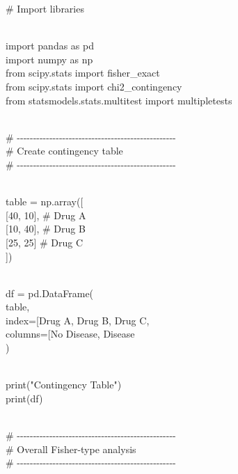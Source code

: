 \documentclass[
]{article}
\begin{document}
\# Import libraries\\
\strut \\
import pandas as pd\\
import numpy as np\\
from scipy.stats import fisher\_exact\\
from scipy.stats import chi2\_contingency\\
from statsmodels.stats.multitest import multipletests\\
\strut \\
\#
-\/-\/-\/-\/-\/-\/-\/-\/-\/-\/-\/-\/-\/-\/-\/-\/-\/-\/-\/-\/-\/-\/-\/-\/-\/-\/-\/-\/-\/-\/-\/-\/-\/-\/-\/-\/-\/-\/-\/-\/-\/-\/-\/-\/-\/-\/-\/-\/-\\
\# Create contingency table\\
\#
-\/-\/-\/-\/-\/-\/-\/-\/-\/-\/-\/-\/-\/-\/-\/-\/-\/-\/-\/-\/-\/-\/-\/-\/-\/-\/-\/-\/-\/-\/-\/-\/-\/-\/-\/-\/-\/-\/-\/-\/-\/-\/-\/-\/-\/-\/-\/-\/-\\
\strut \\
table = np.array({[}\\
{[}40, 10{]}, \# Drug A\\
{[}10, 40{]}, \# Drug B\\
{[}25, 25{]} \# Drug C\\
{]})\\
\strut \\
df = pd.DataFrame(\\
table,\\
index={[}\textquotesingle Drug A\textquotesingle, \textquotesingle Drug
B\textquotesingle, \textquotesingle Drug C\textquotesingle{]},\\
columns={[}\textquotesingle No Disease\textquotesingle,
\textquotesingle Disease\textquotesingle{]}\\
)\\
\strut \\
print("Contingency Table")\\
print(df)\\
\strut \\
\#
-\/-\/-\/-\/-\/-\/-\/-\/-\/-\/-\/-\/-\/-\/-\/-\/-\/-\/-\/-\/-\/-\/-\/-\/-\/-\/-\/-\/-\/-\/-\/-\/-\/-\/-\/-\/-\/-\/-\/-\/-\/-\/-\/-\/-\/-\/-\/-\/-\\
\# Overall Fisher-type analysis\\
\#
-\/-\/-\/-\/-\/-\/-\/-\/-\/-\/-\/-\/-\/-\/-\/-\/-\/-\/-\/-\/-\/-\/-\/-\/-\/-\/-\/-\/-\/-\/-\/-\/-\/-\/-\/-\/-\/-\/-\/-\/-\/-\/-\/-\/-\/-\/-\/-\/-\\
\strut \\
\end{document}
